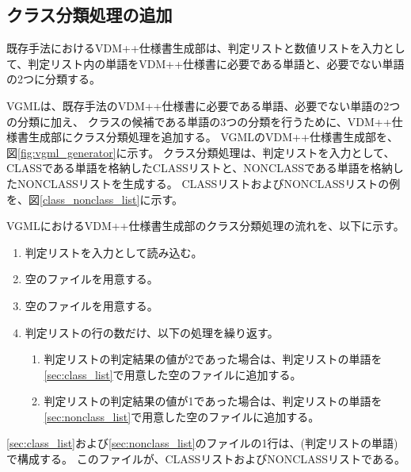 \subsection{クラス分類処理の追加}
\label{sec:classifier_class}
既存手法におけるVDM++仕様書生成部は、判定リストと数値リストを入力として、判定リスト内の単語をVDM++仕様書に必要である単語と、必要でない単語の2つに分類する。

VGMLは、既存手法のVDM++仕様書に必要である単語、必要でない単語の2つの分類に加え、
クラスの候補である単語の3つの分類を行うために、VDM++仕様書生成部にクラス分類処理を追加する。
VGMLのVDM++仕様書生成部を、図\ref{fig:vgml_generator}に示す。
クラス分類処理は、判定リストを入力として、CLASSである単語を格納したCLASSリストと、NONCLASSである単語を格納したNONCLASSリストを生成する。
CLASSリストおよびNONCLASSリストの例を、図\ref{class_nonclass_list}に示す。

VGMLにおけるVDM++仕様書生成部のクラス分類処理の流れを、以下に示す。

\begin{enumerate}
    \item 判定リストを入力として読み込む。
    \item 空のファイルを用意する。
    \label{sec:class_list}
    \item 空のファイルを用意する。
    \label{sec:nonclass_list}
    \item 判定リストの行の数だけ、以下の処理を繰り返す。
        \begin{enumerate}
            \item 判定リストの判定結果の値が2であった場合は、判定リストの単語を\ref{sec:class_list}で用意した空のファイルに追加する。
            \item 判定リストの判定結果の値が1であった場合は、判定リストの単語を\ref{sec:nonclass_list}で用意した空のファイルに追加する。
        \end{enumerate}
\end{enumerate}

\ref{sec:class_list}および\ref{sec:nonclass_list}のファイルの1行は、(判定リストの単語)で構成する。
このファイルが、CLASSリストおよびNONCLASSリストである。

